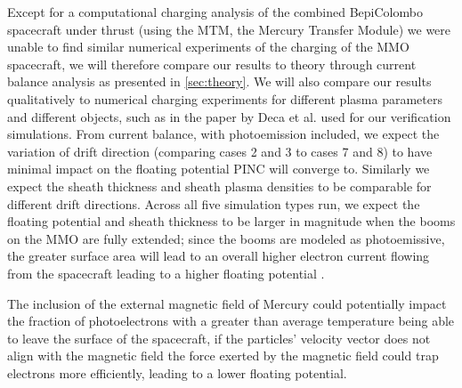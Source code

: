 Except for a computational charging analysis of the combined BepiColombo spacecraft under thrust (using the MTM, the Mercury Transfer Module)  we were unable to find similar numerical experiments of the charging of the MMO spacecraft, we will therefore compare our results to theory through current balance analysis as presented in \ref{sec:theory}. We will also compare our results qualitatively to numerical charging experiments for different plasma parameters and different objects, such as in the paper by Deca et al. \parencite{Deca2013} used for our verification simulations.
From current balance, with photoemission included, we expect the variation of drift direction (comparing cases 2 and 3 to cases 7 and 8) to have minimal impact on the floating potential PINC will converge to. Similarly we expect the sheath thickness and sheath plasma densities to be comparable for different drift directions. Across all five simulation types run, we expect the floating potential and sheath thickness to be larger in magnitude when the booms on the MMO are fully extended; since the booms are modeled as photoemissive, the greater surface area will lead to an overall higher electron current flowing from the spacecraft leading to a higher floating potential . 

The inclusion of the external magnetic field of Mercury could potentially impact the fraction of photoelectrons with a greater than average temperature being able to leave the surface of the spacecraft, if the particles' velocity vector does not align with the magnetic field the force exerted by the magnetic field could trap electrons more efficiently, leading to a lower floating potential.        

